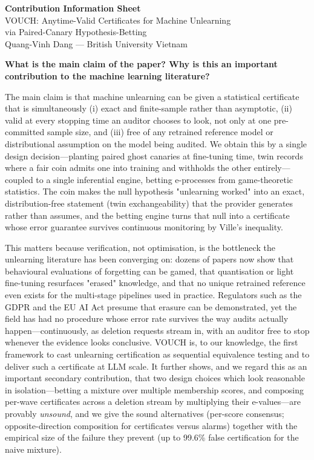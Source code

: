\documentclass[10pt]{article}
\begin{document}
\begin{center}
{\Large\bfseries Contribution Information Sheet}\\[4pt]
{\large VOUCH: Anytime-Valid Certificates for Machine Unlearning\\
via Paired-Canary Hypothesis-Betting}\\[4pt]
Quang-Vinh Dang --- British University Vietnam
\end{center}

\vspace{4pt}
\noindent\textbf{What is the main claim of the paper? Why is this an important
contribution to the machine learning literature?}

The main claim is that machine unlearning can be given a statistical certificate that
is simultaneously (i) exact and finite-sample rather than asymptotic, (ii) valid at
every stopping time an auditor chooses to look, not only at one pre-committed sample
size, and (iii) free of any retrained reference model or distributional assumption on
the model being audited. We obtain this by a single design decision---planting
paired ghost canaries at fine-tuning time, twin records where a fair coin admits one
into training and withholds the other entirely---coupled to a single inferential
engine, betting e-processes from game-theoretic statistics. The coin makes the null
hypothesis "unlearning worked" into an exact, distribution-free statement (twin
exchangeability) that the provider generates rather than assumes, and the betting
engine turns that null into a certificate whose error guarantee survives continuous
monitoring by Ville's inequality.

This matters because verification, not optimisation, is the bottleneck the unlearning
literature has been converging on: dozens of papers now show that behavioural
evaluations of forgetting can be gamed, that quantisation or light fine-tuning
resurfaces "erased" knowledge, and that no unique retrained reference even exists for
the multi-stage pipelines used in practice. Regulators such as the GDPR and the EU AI
Act presume that erasure can be demonstrated, yet the field has had no procedure whose
error rate survives the way audits actually happen---continuously, as deletion
requests stream in, with an auditor free to stop whenever the evidence looks
conclusive. VOUCH is, to our knowledge, the first framework to cast unlearning
certification as sequential equivalence testing and to deliver such a certificate at
LLM scale. It further shows, and we regard this as an important secondary
contribution, that two design choices which look reasonable in isolation---betting a
mixture over multiple membership scores, and composing per-wave certificates across a
deletion stream by multiplying their e-values---are provably \emph{unsound}, and we
give the sound alternatives (per-score consensus; opposite-direction composition for
certificates versus alarms) together with the empirical size of the failure they
prevent (up to 99.6\% false certification for the naive mixture).
\end{document}

